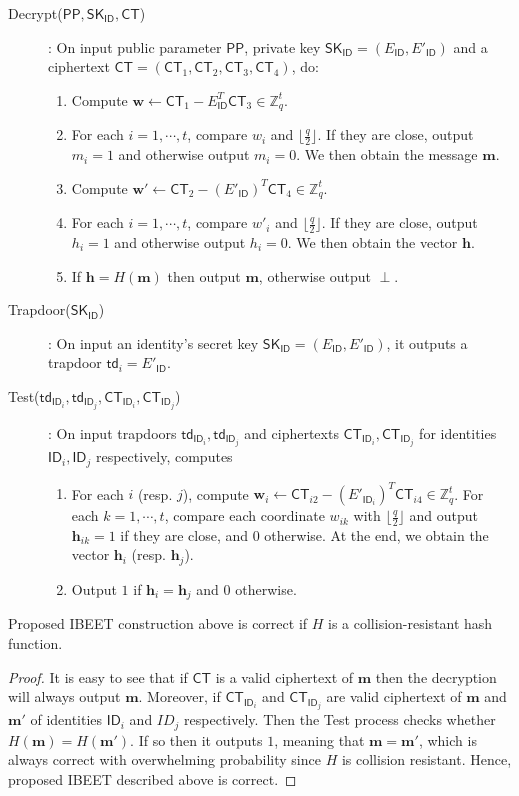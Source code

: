 \documentclass[runningheads]{llncs}
\def\ZZ{\mathbb{Z}}
\def\bf{\mathbf}
\def\SK{\mathsf{SK}}
\def\PP{\mathsf{PP}}
\def\CT{\mathsf{CT}}
\def\td{\mathsf{td}}
\def\ID{\mathsf{ID}}
\begin{document}
\begin{description}
		\item[Decrypt($\PP,\SK_\ID,\CT$)]: On input public parameter $\PP$, private key $\SK_\ID=(E_\ID,E'_\ID)$ and a ciphertext $\CT=(\CT_1,\CT_2,\CT_3,\CT_4)$, do:
		\begin{enumerate}
			\item Compute $\bf{w}\gets\CT_1-E_{\ID}^T\CT_3\in\ZZ_q^t$.
			\item For each $i=1,\cdots, t$, compare $w_i$ and $\lfloor\frac{q}{2}\rfloor$. If they are close, output $m_i=1$ and otherwise output $m_i=0$. We then obtain the message $\bf{m}$.
			\item Compute $\bf{w}'\gets\CT_2-(E'_{\ID})^T\CT_4\in\ZZ_q^t$.
			\item For each $i=1,\cdots,t$, compare $w'_i$ and $\lfloor\frac{q}{2}\rfloor$. If they are close, output $h_i=1$ and otherwise output $h_i=0$. We then obtain the vector $\bf{h}$.
			\item If $\bf{h}=H(\bf{m})$ then output $\bf{m}$, otherwise output $\perp$.
		\end{enumerate}
		\item[Trapdoor($\SK_\ID$)]: On input an identity's secret key $\SK_\ID=(E_\ID,E'_\ID)$, it outputs a trapdoor $\td_i=E'_\ID$.
		\item[Test($\td_{\ID_i},\td_{\ID_j},\CT_{\ID_i},\CT_{\ID_j}$)]: On input trapdoors $\td_{\ID_i}, \td_{\ID_j}$ and ciphertexts $\CT_{\ID_i},\CT_{\ID_j}$ for identities $\ID_i, \ID_j$ respectively, computes 
		\begin{enumerate}
			\item For each $i$ (resp. $j$), compute $\bf{w}_i\gets \CT_{i2}-(E'_{\ID_i})^T\CT_{i4}\in\ZZ_q^t$. For each $k=1,\cdots, t$, compare each coordinate $w_{ik}$ with $\lfloor\frac{q}{2}\rfloor$ and output $\bf{h}_{ik}=1$ if they are close, and $0$ otherwise. At the end, we obtain the vector $\bf{h}_i$ (resp. $\bf{h}_j$). 
			\item Output $1$ if  $\bf{h}_i=\bf{h}_j$ and $0$ otherwise.
		\end{enumerate}
	\end{description}
	
	
	\begin{theorem}
		Proposed IBEET construction above is correct if $H$  is a collision-resistant hash function.
	\end{theorem}
	\begin{proof}
		It is easy to see that if $\CT$ is a valid ciphertext of $\bf{m}$ then the decryption will always output $\bf{m}$. Moreover, if $\CT_{\ID_i}$ and $\CT_{\ID_j}$ are valid ciphertext of $\bf{m}$ and $\bf{m}'$ of identities $\ID_i$ and $ID_j$ respectively. Then the Test process checks whether $H(\bf{m})=H(\bf{m}')$. If so then it outputs $1$, meaning that $\bf{m}=\bf{m}'$, which is always correct with overwhelming probability since $H$ is collision resistant. Hence, proposed IBEET described above is correct.
	\end{proof}
	
\end{document}
